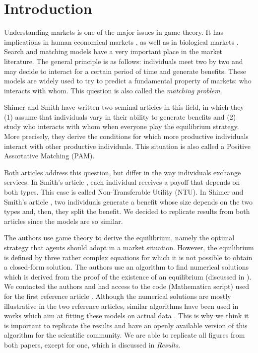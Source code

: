 \section*{Introduction}

Understanding markets is one of the major issues in game theory. It has implications in human economical markets \citep{chade_sorting_2017,osborne_bargaining_1990}, as well as in biological markets \citep{fruteau_supply_2009,hammerstein_biological_2016,noe_biological_1995,baumard_mutualistic_2013}. Search and matching models have a very important place in the market literature. The general principle is as follows: individuals meet two by two and may decide to interact for a certain period of time and generate benefits. These models are widely used to try to predict a fundamental property of markets: who interacts with whom. This question is also called the \textit{matching problem}.

Shimer and Smith have written two seminal articles \citep{shimer_assortative_2000,smith_marriage_2006} in this field, in which they (1) assume that individuals vary in their ability to generate benefits and (2) study who interacts with whom when everyone play the equilibrium strategy. More precisely, they derive the conditions for which more productive individuals interact with other productive individuals. This situation is also called a Positive Assortative Matching (PAM).

Both articles address this question, but differ in the way individuals exchange services. In Smith's article \citep{smith_marriage_2006}, each individual receives a payoff that depends on both types. This case is called Non-Transferable Utility (NTU). In Shimer and Smith's article \citep{shimer_assortative_2000}, two individuals generate a benefit whose size depends on the two types and, then, they split the benefit. We decided to replicate results from both articles since the models are so similar.

The authors use game theory to derive the equilibrium, namely the optimal strategy that agents should adopt in a market situation. However, the equilibrium is defined by three rather complex equations for which it is not possible to obtain a closed-form solution. The authors use an algorithm to find numerical solutions which is derived from the proof of the existence of an equilibrium (discussed in \citep{smith_frictional_2011}). We contacted the authors and had access to the code (Mathematica script) used for the first reference article \citep{shimer_assortative_2000}. Although the numerical solutions are mostly illustrative in the two reference articles, similar algorithms have been used in works which aim at fitting these models on actual data \citep{hagedorn_identifying_2017,lise_matching_2016}. This is why we think it is important to replicate the results and have an openly available version of this algorithm for the scientific community. We are able to replicate all figures from both papers, except for one, which is discussed in \textit{Results}.




